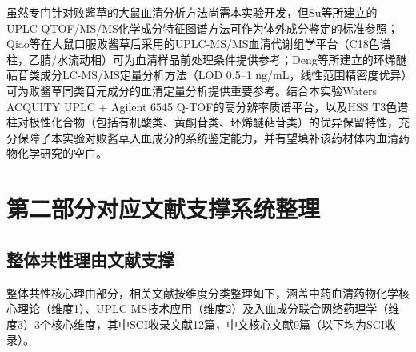 \documentclass[12pt,a4paper,UTF8,scheme=chinese]{ctexart}
\begin{document}
虽然专门针对败酱草的大鼠血清分析方法尚需本实验开发，但Su等\cite{Su2022}所建立的UPLC-QTOF/MS/MS化学成分特征图谱方法可作为体外成分鉴定的标准参照；Qiao等\cite{Qiao2022}在大鼠口服败酱草后采用的UPLC-MS/MS血清代谢组学平台（C18色谱柱，乙腈/水流动相）可为血清样品前处理条件提供参考；Deng等\cite{Deng2014}所建立的环烯醚萜苷类成分LC-MS/MS定量分析方法（LOD 0.5--1 ng/mL，线性范围精密度优异）可为败酱草同类苷元成分的血清定量分析提供重要参考。结合本实验Waters ACQUITY UPLC + Agilent 6545 Q-TOF的高分辨率质谱平台，以及HSS T3色谱柱对极性化合物（包括有机酸类、黄酮苷类、环烯醚萜苷类）的优异保留特性，充分保障了本实验对败酱草入血成分的系统鉴定能力，并有望填补该药材体内血清药物化学研究的空白。

\newpage
\section{第二部分\enspace 对应文献支撑系统整理}

\subsection{整体共性理由文献支撑}

整体共性核心理由部分，相关文献按维度分类整理如下，涵盖中药血清药物化学核心理论（维度1）、UPLC-MS技术应用（维度2）及入血成分联合网络药理学（维度3）3个核心维度，其中SCI收录文献12篇，中文核心文献0篇（以下均为SCI收录）。
\end{document}
